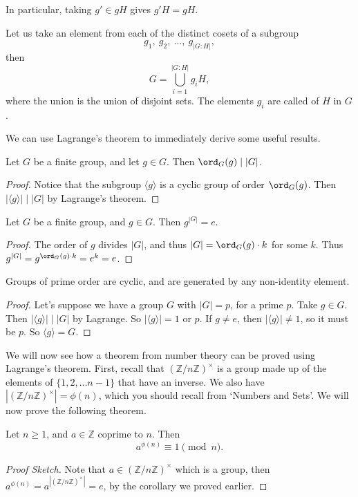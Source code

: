\documentclass[a4paper]{scrartcl}
\begin{document}
In particular, taking $g' \in gH$ gives $g'H = gH$.

Let us take an element from each of the distinct cosets of a subgroup
$$
g_1,\ g_2, \ \dots, \ g_{|G:H|},
$$
then
$$
G = \bigcup_{i = 1}^{|G:H|} g_i H,
$$
where the union is the union of disjoint sets. The elements $g_i$ are called  of $H$ in $G$. 

We can use Lagrange's theorem to immediately derive some useful results.

\begin{corollary}
	Let $G$ be a finite group, and let $g \in G$. Then $\ord_G(g) \mid |G|$.
\end{corollary}
\begin{proof}
	Notice that the subgroup $\langle g \rangle$ is a cyclic group of order $\ord_G(g)$. Then $|\langle g \rangle|  \mid |G|$ by Lagrange's theorem.
\end{proof}

\begin{corollary}
	Let $G$ be a finite group, and $g \in G$. Then $g^{|G|} = e$.
\end{corollary}
\begin{proof}
	The order of $g$ divides $|G|$, and thus $|G| = \ord_G(g) \cdot k$ for some $k$. Thus $g^{|G|} = g^{\ord_G(g) \cdot k} = e^k = e$.
\end{proof}

\begin{corollary}\label{cor:primecyclic}
	Groups of prime order are cyclic, and are generated by any non-identity element.
\end{corollary}
\begin{proof}
Let's suppose we have a group $G$ with $|G| = p$, for a prime $p$. Take $g \in G$. Then $|\langle g \rangle| \mid |G|$ by Lagrange. So $|\langle g \rangle | = 1$ or $p$. If $g \neq e$, then $|\langle g \rangle |\neq 1$, so it must be $p$. So $\langle g \rangle = G$. 
\end{proof}

We will now see how a theorem from number theory can be proved using Lagrange's theorem. First, recall that $(\mathbb{Z}/n\mathbb{Z})^\times$ is a group made up of the elements of $\{1, 2, \dots n - 1\}$ that have an inverse. We also have $|(\mathbb{Z}/n\mathbb{Z})^\times| = \phi(n)$, which you should recall from `Numbers and Sets'. We will now prove the following theorem.

\begin{theorem}
	Let $n \geq 1$, and $a \in \mathbb{Z}$ coprime to $n$. Then
	$$
	a^{\phi(n)} \equiv 1 \pmod{n}.
	$$
\end{theorem}
\begin{proof}[Proof Sketch]
	Note that $a \in (\mathbb{Z}/n\mathbb{Z})^\times$ which is a group, then $a^{\phi(n)} = a^{| (\mathbb{Z}/n\mathbb{Z})^\times|} = e$, by the corollary we proved earlier.
\end{proof}
\end{document}

